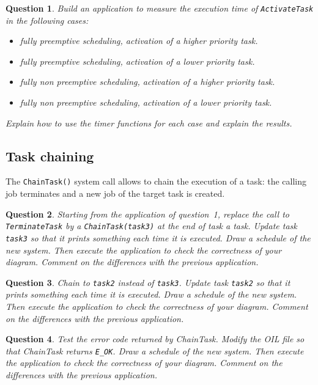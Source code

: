 \documentclass[11pt]{report}
\newcommand{\namedtodo}[2][]{%
{%
\todo[color={yellow!50},size=\small]{%
\textbf{TODO [\uppercase{#1}]:}~#2}%
}}
\newtheorem{ex}{Question}
\begin{document}

\begin{ex}
    Build an application to measure the execution time of \texttt{ActivateTask} in the following cases:
    \begin{itemize}
        \item fully preemptive scheduling, activation of a higher priority task.
        \item fully preemptive scheduling, activation of a lower priority task.
        \item fully non preemptive scheduling, activation of a higher priority task.
        \item fully non preemptive scheduling, activation of a lower priority task.
    \end{itemize}

    Explain how to use the timer functions for each case and explain the results.
\end{ex}

\subsection{Task chaining}

The \texttt{ChainTask()} system call allows to chain the execution of a task: the calling job terminates and a new job of the target task is created.

\begin{ex}
    Starting from the application of question~1, replace the call to \texttt{TerminateTask} by a \texttt{ChainTask(task3)} at the end of task a task.
    Update task \texttt{task3} so that it prints something each time it is executed.
    Draw a schedule of the new system.
    Then execute the application to check the correctness of your diagram.
    Comment on the differences with the previous application.
\end{ex}

\begin{ex}
    Chain to \texttt{task2} instead of \texttt{task3}.
    Update task \texttt{task2} so that it prints something each time it is executed.
    Draw a schedule of the new system.
    Then execute the application to check the correctness of your diagram.
    Comment on the differences with the previous application.
\end{ex}

\begin{ex}
    Test the error code returned by ChainTask.
    Modify the OIL file so that ChainTask returns \texttt{E\_OK}.
    Draw a schedule of the new system.
    Then execute the application to check the correctness of your diagram.
    Comment on the differences with the previous application.
\end{ex}
\end{document}
